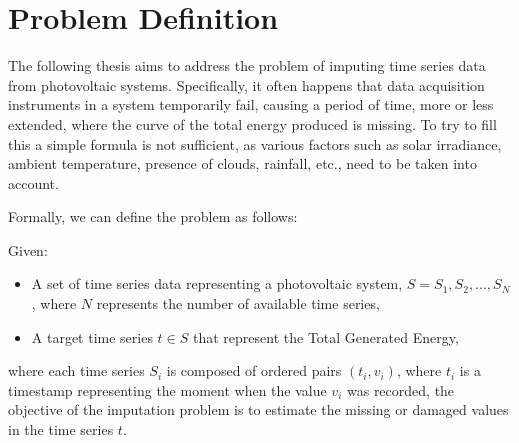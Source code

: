 \section{Problem Definition}
The following thesis aims to address the problem of imputing time series data from
photovoltaic systems. Specifically, it often happens that data acquisition
instruments in a system temporarily fail, causing a period of time, more or
less extended, where the curve of the total energy produced is missing.
To try to fill this  a simple formula is not sufficient,
as various factors such as solar irradiance, ambient temperature,
presence of clouds, rainfall, etc., need to be taken into account.

Formally, we can define the problem as follows:

\begin{definition}
	Given:
	\begin{itemize}
		\item A set of time series data representing a photovoltaic
		      system, $S = {S_1, S_2, ..., S_N}$, where $N$ represents
		      the number of available time series,
		\item A target time series $t \in S$ that represent the Total Generated Energy,
	\end{itemize}
	where each time series $S_i$ is composed of ordered pairs $(t_i, v_i)$, where $t_i$ is
	a timestamp representing the moment when the value $v_i$ was recorded,
	the objective of the imputation problem is to estimate the missing or damaged values
	in the time series $t$.
\end{definition}


